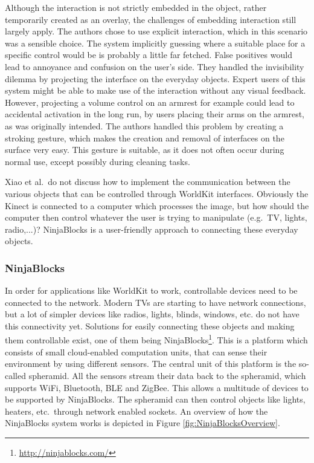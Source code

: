 Although the interaction is not strictly embedded in the object, rather temporarily created as an overlay, the challenges of embedding interaction still largely apply.
The authors chose to use explicit interaction, which in this scenario was a sensible choice.
The system implicitly guessing where a suitable place for a specific control would be is probably a little far fetched. 
False positives would lead to annoyance and confusion on the user's side.
They handled the invisibility dilemma by projecting the interface on the everyday objects.
Expert users of this system might be able to make use of the interaction without any visual feedback. However, projecting a volume control on an armrest for example could lead to accidental activation in the long run, by users placing their arms on the armrest, as was originally intended.
The authors handled this problem by creating a stroking gesture, which makes the creation and removal of interfaces on the surface very easy.
This gesture is suitable, as it does not often occur during normal use, except possibly during cleaning tasks.

Xiao et al.\ do not discuss how to implement the communication between the various objects that can be controlled through WorldKit interfaces.
Obviously the Kinect is connected to a computer which processes the image, but how should the computer then control whatever the user is trying to manipulate (e.g.\ TV, lights, radio,...)?
NinjaBlocks is a user-friendly approach to connecting these everyday objects.

\subsubsection{NinjaBlocks}
\label{sec:ninjaBlocks}
In order for applications like WorldKit to work, controllable devices need to be connected to the network.
Modern TVs are starting to have network connections, but a lot of simpler devices like radios, lights, blinds, windows, etc. do not have this connectivity yet.
Solutions for easily connecting these objects and making them controllable exist, one of them being NinjaBlocks\footnote{\url{http://ninjablocks.com/}}.
This is a platform which consists of small cloud-enabled computation units, that can sense their environment by using different sensors. 
The central unit of this platform is the so-called spheramid.
All the sensors stream their data back to the spheramid, which supports WiFi, Bluetooth, BLE and ZigBee.
This allows a multitude of devices to be supported by NinjaBlocks.
The spheramid can then control objects like lights, heaters, etc.\ through network enabled sockets. An overview of how the NinjaBlocks system works is depicted in Figure \ref{fig:NinjaBlocksOverview}.

